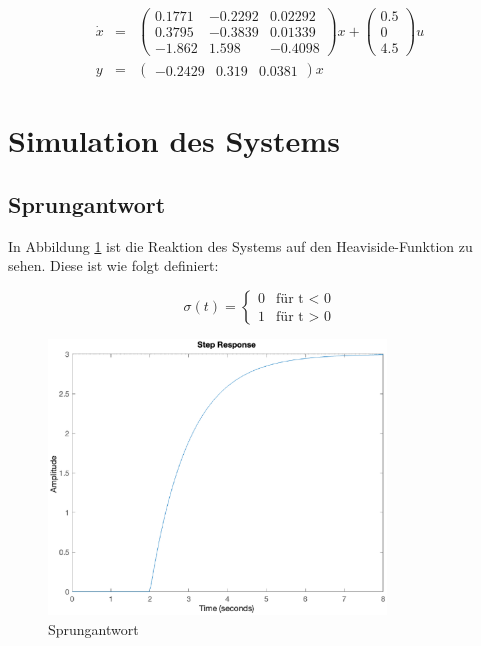 \begin{eqnarray*}
    \dot x &=& \left(\begin{array}{ccc} 0.1771 & -0.2292 & 0.02292\\ 0.3795 & -0.3839 & 0.01339\\ -1.862 & 1.598 & -0.4098 \end{array}\right)x + \left(\begin{array}{c} 0.5\\ 0\\ 4.5 \end{array}\right)u \\
    y &=& \left(\begin{array}{ccc} -0.2429 & 0.319 & 0.0381 \end{array}\right)x
\end{eqnarray*}



\section{Simulation des Systems}

\subsection{Sprungantwort}

In Abbildung \ref{fig:sprung} ist die Reaktion des Systems auf den Heaviside-Funktion zu sehen. Diese ist wie folgt definiert:

\[
\sigma (t) = \begin{cases} 0 & \text{für t < 0} \\ 1 & \text{für t > 0} \end{cases}  
\]

\begin{figure}[H]
    \label{fig:sprung}
    \centering
    \includegraphics[width=0.8\textwidth]{Bilder/SprungantwortPT1Tt.eps}
    \caption{Sprungantwort}
 \end{figure}


